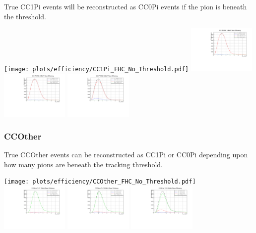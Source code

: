 True CC1Pi events will be reconstructed as CC0Pi events if the pion is beneath the threshold.

\begin{center}

\texttt{[image: plots/efficiency/CC1Pi\_FHC\_No\_Threshold.pdf]}
\includegraphics[width=0.245\textwidth]{plots/efficiency/CC1Pi_FHC_10MeV.pdf} 
\includegraphics[width=0.245\textwidth]{plots/efficiency/CC1Pi_FHC_20MeV.pdf}
\includegraphics[width=0.245\textwidth]{plots/efficiency/CC1Pi_FHC_50MeV.pdf}

\end{center}

\subsubsection{CCOther}

True CCOther events can be reconstructed as CC1Pi or CC0Pi depending upon how many pions are beneath the tracking threshold.

\begin{center}

\texttt{[image: plots/efficiency/CCOther\_FHC\_No\_Threshold.pdf]}
\includegraphics[width=0.245\textwidth]{plots/efficiency/CCOther_FHC_10MeV.pdf} 
\includegraphics[width=0.245\textwidth]{plots/efficiency/CCOther_FHC_20MeV.pdf}
\includegraphics[width=0.245\textwidth]{plots/efficiency/CCOther_FHC_50MeV.pdf}

\end{center}


